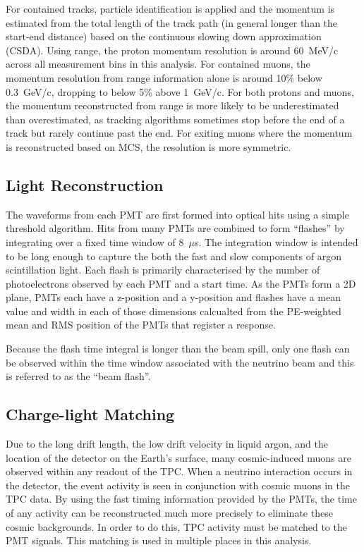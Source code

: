 \documentclass[%
twocolumn,
 amsmath,amssymb,
 aps,
prd,
superscriptaddress,showpacs]{revtex4-2}
\begin{document}
For contained tracks, particle identification is applied and the momentum is estimated from the total length of the track path (in general longer than the start-end distance) based on the continuous slowing down approximation (CSDA).
Using range, the proton momentum resolution is around 60~MeV/c across all measurement bins in this analysis.
For contained muons, the momentum resolution from range information alone is around 10\% below 0.3~GeV/c, dropping to below 5\% above 1~GeV/c.
For both protons and muons, the momentum reconstructed from range is more likely to be underestimated than overestimated, as tracking algorithms sometimes stop before the end of a track but rarely continue past the end.
For exiting muons where the momentum is reconstructed based on MCS, the resolution is more symmetric.

\subsection{Light Reconstruction}
The waveforms from each PMT are first formed into optical hits using a simple threshold algorithm.
Hits from many PMTs are combined to form ``flashes'' by integrating over a fixed time window of 8~$\mu$s.
The integration window is intended to be long enough to capture the both the fast and slow components of argon scintillation light.
Each flash is primarily characterised by the number of photoelectrons observed by each PMT and a start time.
As the PMTs form a 2D plane, PMTs each have a z-position and a y-position and flashes have a mean value and width in each of those dimensions calcualted from the PE-weighted mean and RMS position of the PMTs that register a response.

Because the flash time integral is longer than the beam spill, only one flash can be observed within the time window associated with the neutrino beam and this is referred to as the ``beam flash''.

\subsection{Charge-light Matching} \label{subsec:TPCPMTmatching}
Due to the long drift length, the low drift velocity in liquid argon, and the location of the detector on the Earth's surface, many cosmic-induced muons are observed within any readout of the TPC.
When a neutrino interaction occurs in the detector, the event activity is seen in conjunction with cosmic muons in the TPC data.
By using the fast timing information provided by the PMTs, the time of any activity can be reconstructed much more precisely to eliminate these cosmic backgrounds.
In order to do this, TPC activity must be matched to the PMT signals.
This matching is used in multiple places in this analysis.
\end{document}
